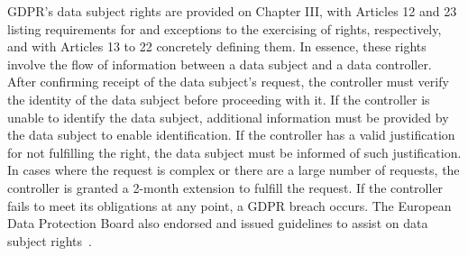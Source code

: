 \documentclass{IOS-Book-Article}     %
\begin{document}
GDPR's data subject rights are provided on Chapter III, with Articles 12 and 23 listing requirements for and exceptions to the exercising of rights, respectively, and with Articles 13 to 22 concretely defining them.
In essence, these rights involve the flow of information between a data subject and a data controller.
After confirming receipt of the data subject's request, the controller must verify the identity of the data subject before proceeding with it.
If the controller is unable to identify the data subject, additional information must be provided by the data subject to enable identification.
If the controller has a valid justification for not fulfilling the right, the data subject must be informed of such justification.
In cases where the request is complex or there are a large number of requests, the controller is granted a 2-month extension to fulfill the request.
If the controller fails to meet its obligations at any point, a GDPR breach occurs.
The European Data Protection Board also endorsed and issued guidelines to assist on data subject rights~\cite{european_data_protection_board_guidelines_2023,article_29_data_protection_working_party_guidelines_2017,sis_ii_supervision_coordination_group_schengen_2023}.
\end{document}
